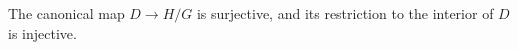 The canonical map $D \to H/G$ is surjective, and its restriction to the interior of $D$ is injective.
